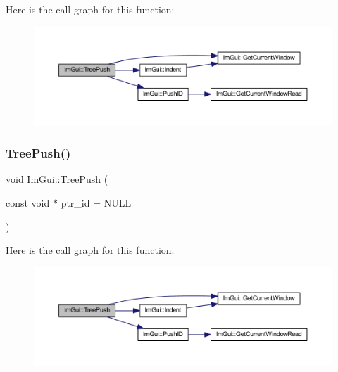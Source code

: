 Here is the call graph for this function\+:
\nopagebreak
\begin{figure}[H]
\begin{center}
\leavevmode
\includegraphics[width=350pt]{namespace_im_gui_a30b5df3be04a6e712985612bbdea6656_cgraph}
\end{center}
\end{figure}
\mbox{\label{namespace_im_gui_a71440d86edee2b23abc25cb80e9c9444}} 
\subsubsection{\texorpdfstring{Tree\+Push()}{TreePush()}\hspace{0.1cm}{\footnotesize\ttfamily [2/2]}}
{\footnotesize\ttfamily void Im\+Gui\+::\+Tree\+Push (\begin{DoxyParamCaption}\item[{const void $\ast$}]{ptr\+\_\+id = {\ttfamily NULL} }\end{DoxyParamCaption})}

Here is the call graph for this function\+:
\nopagebreak
\begin{figure}[H]
\begin{center}
\leavevmode
\includegraphics[width=350pt]{namespace_im_gui_a71440d86edee2b23abc25cb80e9c9444_cgraph}
\end{center}
\end{figure}
\mbox{\label{namespace_im_gui_afddcddce9f2801769e4c79ef769ab600}} 

